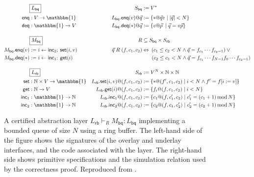 \documentclass[sigplan,10pt,review,anonymous]{acmart}
\newcommand{\kw}[1]{\ensuremath{ \mathsf{#1} }}
\begin{document}
\begin{figure*} %
  \begin{minipage}{.9\textwidth}
    \begin{align*}
      & \fbox{$L_\kw{bq}$} &
        S_\kw{bq} &:= V^* \\
      \kw{enq} &: V \rightarrow \mathbbm{1} &
        L_\kw{bq}.\kw{enq}(v)@\vec{q} &:= \{ * @ \vec{q} v \mid |\vec{q}| < N \} \\
      \kw{deq} &: \mathbbm{1} \rightarrow V &
        L_\kw{bq}.\kw{deq}(*)@\vec{q} &:= \{ v @ \vec{p} \: \mid \vec{q} = v \vec{p} \}
      \\[1em]
      & \fbox{$M_\kw{bq}$} &
        R &\subseteq S_\kw{bq} \times S_\kw{rb} \\
      M_\kw{bq}.\kw{enq}(v) &:= i \leftarrow \kw{inc}_2 ; \: \kw{set}(i, v) &
        \vec{q} \mathrel{R} (f, c_1, c_2) &\Leftrightarrow
        \: (c_1 \le c_2 < N \wedge
            \vec{q} = f_{c_1} \cdots f_{c_2-1}) \vee {}
      \\
      M_\kw{bq}.\kw{deq}(*) &:= i \leftarrow \kw{inc}_1 ; \: \kw{get}(i) &
        & \qquad \! (c_2 \le c_1 < N \wedge
            \vec{q} = f_{c_1} \cdots f_{N-1} f_0 \cdots f_{c_2 - 1})
      \\[1em]
      & \fbox{$L_\kw{rb}$} &
        S_\kw{rb} &:= V^N \times \mathbb{N} \times \mathbb{N}
      \\
      \kw{set} &: \mathbb{N} \times V \rightarrow \mathbbm{1} &
        L_\kw{rb}.\kw{set}(i, v)@(f, c_1, c_2) &:=
        \{ *@(f', c_1, c_2) \mid i < N \wedge f' = f[i := v] \}
      \\
      \kw{get} &: \mathbb{N} \rightarrow V &
        L_\kw{rb}.\kw{get}(i)@(f, c_1, c_2) &:=
        \{ f_i@(f, c_1, c_2) \mid i < N \}
      \\
      \kw{inc}_1 &: \mathbbm{1} \rightarrow \mathbb{N} &
        L_\kw{rb}.\kw{inc}_1@(f, c_1, c_2) &:=
        \{ c_1@(f, c_1', c_2) \mid
           c_1' = (c_1 + 1) \mathop{\mathrm{mod}} N \}
      \\
      \kw{inc}_2 &: \mathbbm{1} \rightarrow \mathbb{N} &
        L_\kw{rb}.\kw{inc}_2@(f, c_1, c_2) &:=
        \{ c_2@(f, c_1, c_2') \mid
           c_2' = (c_2 + 1) \mathop{\mathrm{mod}} N \}
    \end{align*}
  \end{minipage}
  \caption{
    A certified abstraction layer
    $L_\kw{rb} \vdash_R M_\kw{bq} : L_\kw{bq}$
    implementing a bounded queue of size $N$
    using a ring buffer.
    The left-hand side of the figure shows
    the signatures of the overlay and underlay interfaces,
    and the code associated with the layer.
    The right-hand side shows primitive specifications
    and the simulation relation used by the correctness proof.
    Reproduced from \citet{rbgs-cal}.}
  \label{fig:cal}
\end{figure*}
\end{document}
